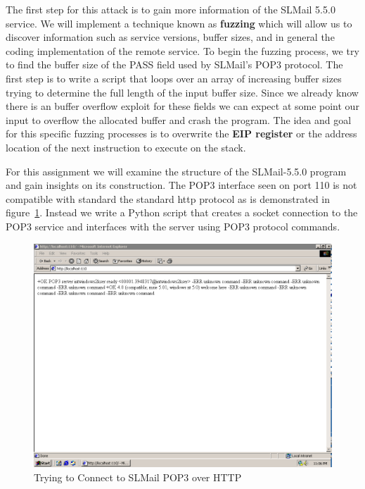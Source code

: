 \documentclass[12pt]{article}
\begin{document}
The first step for this attack is to gain more information of the
SLMail 5.5.0 service. We will implement a technique known as \textbf{fuzzing}
which will allow us to discover information such as service versions, 
buffer sizes, and in general the coding implementation of the remote
service. To begin the fuzzing process, we try to find the buffer size of the 
PASS field used by SLMail's POP3 protocol. The first step is to write a 
script that loops over an array of increasing buffer sizes trying to 
determine the full length of the input buffer size. Since we already know 
there is an buffer overflow exploit for these fields we can expect at some 
point our input to overflow the allocated buffer and crash the program. 
The idea and goal for this specific fuzzing processes is to overwrite the 
\textbf{EIP register} or the address location of the next instruction
to execute on the stack.

For this assignment we will examine the structure of the SLMail-5.5.0 
program and gain insights on its construction. The POP3 interface seen on 
port 110 is not compatible with standard the standard http protocol as is 
demonstrated in figure~\ref{fig:smailpop3http}. Instead we write a Python
script that creates a socket connection to the POP3 service and interfaces
with the server using POP3 protocol commands. 

\begin{figure}[ht]
    \centering
    \includegraphics[width=5.5in]{images/20160407_http_smail.png}
    \caption{Trying to Connect to SLMail POP3 over HTTP}
    \label{fig:smailpop3http}
\end{figure}
\end{document}
